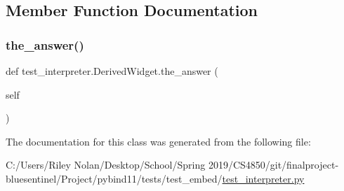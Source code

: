 \subsection{Member Function Documentation}
\mbox{\label{classtest__interpreter_1_1_derived_widget_accd3078b91fa129dcba8ede828fb21e4}} 
\subsubsection{\texorpdfstring{the\_answer()}{the\_answer()}}
{\footnotesize\ttfamily def test\+\_\+interpreter.\+Derived\+Widget.\+the\+\_\+answer (\begin{DoxyParamCaption}\item[{}]{self }\end{DoxyParamCaption})}



The documentation for this class was generated from the following file\+:\begin{DoxyCompactItemize}
\item 
C\+:/\+Users/\+Riley Nolan/\+Desktop/\+School/\+Spring 2019/\+C\+S4850/git/finalproject-\/bluesentinel/\+Project/pybind11/tests/test\+\_\+embed/\mbox{\hyperlink{test__interpreter_8py}{test\+\_\+interpreter.\+py}}\end{DoxyCompactItemize}

